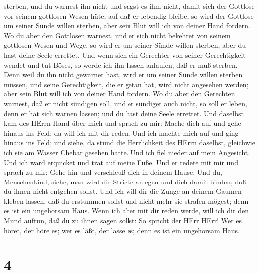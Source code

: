 sterben, und du warnest ihn nicht und sagst es ihm nicht, damit sich der
Gottlose vor seinem gottlosen Wesen hüte, auf daß er lebendig bleibe, so
wird der Gottlose um seiner Sünde willen sterben, aber sein Blut will
ich von deiner Hand fordern.  Wo du aber den Gottlosen
warnest, und er sich nicht bekehret von seinem gottlosen Wesen und Wege,
so wird er um seiner Sünde willen sterben, aber du hast deine Seele
errettet.  Und wenn sich ein Gerechter von seiner
Gerechtigkeit wendet und tut Böses, so werde ich ihn lassen anlaufen,
daß er muß sterben. Denn weil du ihn nicht gewarnet hast, wird er um
seiner Sünde willen sterben müssen, und seine Gerechtigkeit, die er
getan hat, wird nicht angesehen werden; aber sein Blut will ich von
deiner Hand fordern.  Wo du aber den Gerechten warnest, daß
er nicht sündigen soll, und er sündiget auch nicht, so soll er leben,
denn er hat sich warnen lassen; und du hast deine Seele errettet.
 Und daselbst kam des HErrn Hand über mich und sprach zu
mir: Mache dich auf und gehe hinaus ins Feld; da will ich mit dir reden.
 Und ich machte mich auf und ging hinaus ins Feld; und
siehe, da stund die Herrlichkeit des HErrn daselbst, gleichwie ich sie
am Wasser Chebar gesehen hatte. Und ich fiel nieder auf mein Angesicht.
 Und ich ward erquicket und trat auf meine Füße. Und er
redete mit mir und sprach zu mir: Gehe hin und verschleuß dich in deinem
Hause.  Und du, Menschenkind, siehe, man wird dir Stricke
anlegen und dich damit binden, daß du ihnen nicht entgehen sollst.
 Und ich will dir die Zunge an deinem Gaumen kleben lassen,
daß du erstummen sollst und nicht mehr sie strafen mögest; denn es ist
ein ungehorsam Haus.  Wenn ich aber mit dir reden werde,
will ich dir den Mund auftun, daß du zu ihnen sagen sollst: So spricht
der HErr HErr! Wer es höret, der höre es; wer es läßt, der lasse es;
denn es ist ein ungehorsam Haus.

\hypertarget{section-3}{%
\section{4}\label{section-3}}


